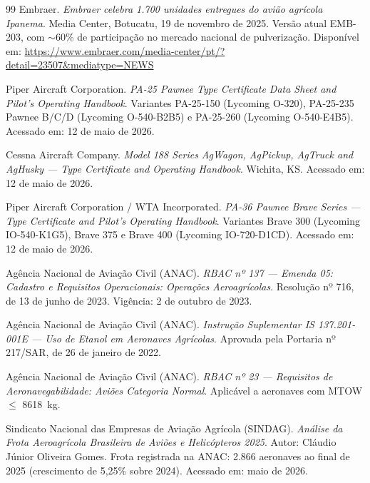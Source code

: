 \documentclass[a4paper,12pt]{article}
\begin{document}
\begin{thebibliography}{99}
    Embraer. \textit{Embraer celebra 1.700 unidades entregues do avião agrícola Ipanema}. Media Center, Botucatu, 19 de novembro de 2025. Versão atual EMB-203, com $\sim$60\% de participação no mercado nacional de pulverização. Disponível em: \url{https://www.embraer.com/media-center/pt/?detail=23507&mediatype=NEWS} %

    Piper Aircraft Corporation. \textit{PA-25 Pawnee Type Certificate Data Sheet and Pilot's Operating Handbook}. Variantes PA-25-150 (Lycoming O-320), PA-25-235 Pawnee B/C/D (Lycoming O-540-B2B5) e PA-25-260 (Lycoming O-540-E4B5). Acessado em: 12 de maio de 2026.

    Cessna Aircraft Company. \textit{Model 188 Series AgWagon, AgPickup, AgTruck and AgHusky --- Type Certificate and Operating Handbook}. Wichita, KS. Acessado em: 12 de maio de 2026.

    Piper Aircraft Corporation / WTA Incorporated. \textit{PA-36 Pawnee Brave Series --- Type Certificate and Pilot's Operating Handbook}. Variantes Brave 300 (Lycoming IO-540-K1G5), Brave 375 e Brave 400 (Lycoming IO-720-D1CD). Acessado em: 12 de maio de 2026.


    Agência Nacional de Aviação Civil (ANAC). \textit{RBAC nº 137 --- Emenda 05: Cadastro e Requisitos Operacionais: Operações Aeroagrícolas}. Resolução nº 716, de 13 de junho de 2023. Vigência: 2 de outubro de 2023.

    Agência Nacional de Aviação Civil (ANAC). \textit{Instrução Suplementar IS 137.201-001E --- Uso de Etanol em Aeronaves Agrícolas}. Aprovada pela Portaria nº 217/SAR, de 26 de janeiro de 2022.

    Agência Nacional de Aviação Civil (ANAC). \textit{RBAC nº 23 --- Requisitos de Aeronavegabilidade: Aviões Categoria Normal}. Aplicável a aeronaves com MTOW $\leq$ \SI{8618}{kg}.

    Sindicato Nacional das Empresas de Aviação Agrícola (SINDAG). \textit{Análise da Frota Aeroagrícola Brasileira de Aviões e Helicópteros 2025}. Autor: Cláudio Júnior Oliveira Gomes. Frota registrada na ANAC: 2.866 aeronaves ao final de 2025 (crescimento de 5,25\% sobre 2024). Acessado em: maio de 2026. %


\end{thebibliography}
\end{document}

